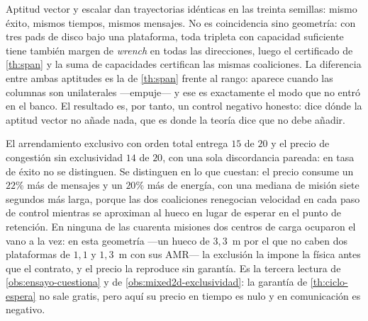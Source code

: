 \begin{observacion}
\label{obs:ensayo-cierre-aptitud}
Aptitud vector y escalar dan trayectorias idénticas en las treinta semillas:
mismo éxito, mismos tiempos, mismos mensajes. No es coincidencia sino
geometría: con tres pads de disco bajo una plataforma, toda tripleta con
capacidad suficiente tiene también margen de \emph{wrench} en todas las
direcciones, luego el certificado de \cref{th:span} y la suma de capacidades
certifican las mismas coaliciones. La diferencia entre ambas aptitudes es la
de \cref{th:span} frente al rango: aparece cuando las columnas son
unilaterales —empuje— y ese es exactamente el modo que no entró en el banco.
El resultado es, por tanto, un control negativo honesto: dice dónde la
aptitud vector no añade nada, que es donde la teoría dice que no debe añadir.
\end{observacion}

\begin{observacion}
\label{obs:ensayo-cierre-pasillo}
El arrendamiento exclusivo con orden total entrega $15$ de $20$ y el precio de
congestión sin exclusividad $14$ de $20$, con una sola discordancia pareada:
en tasa de éxito no se distinguen. Se distinguen en lo que cuestan: el precio
consume un $22\%$ más de mensajes y un $20\%$ más de energía, con una mediana
de misión siete segundos más larga, porque las dos coaliciones renegocian
velocidad en cada paso de control mientras se aproximan al hueco en lugar de
esperar en el punto de retención. En ninguna de las cuarenta misiones dos
centros de carga ocuparon el vano a la vez: en esta geometría —un hueco de
$3{,}3$~m por el que no caben dos plataformas de $1{,}1$ y $1{,}3$~m con sus
AMR— la exclusión la impone la física antes que el contrato, y el precio la
reproduce sin garantía. Es la tercera lectura de \cref{obs:ensayo-cuestiona} y
de \cref{obs:mixed2d-exclusividad}: la garantía de \cref{th:ciclo-espera} no
sale gratis, pero aquí su precio en tiempo es nulo y en comunicación es
negativo.
\end{observacion}

